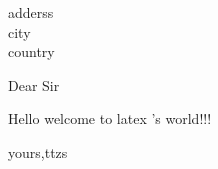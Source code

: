 \documentclass{letter}
\begin{document}
\begin{letter}{adderss\\city\\country}
\opening{Dear Sir}
Hello welcome to latex 's world!!!
\closing{yours,ttzs}

\end{letter}
\end{document}
